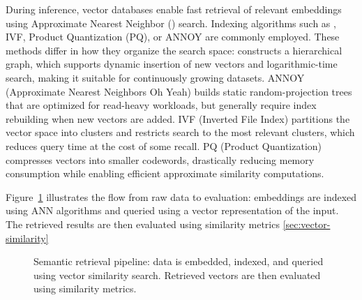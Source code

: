 During inference, vector databases enable fast retrieval of relevant embeddings using Approximate Nearest Neighbor () search. 
Indexing algorithms such as , IVF, Product Quantization (PQ), or ANNOY are commonly employed. 
These methods differ in how they organize the search space: 
 constructs a hierarchical graph, which supports dynamic insertion of new vectors and logarithmic-time search, making it suitable for continuously growing datasets. 
ANNOY (Approximate Nearest Neighbors Oh Yeah) builds static random-projection trees that are optimized for read-heavy workloads, but generally require index rebuilding when new vectors are added. 
IVF (Inverted File Index) partitions the vector space into clusters and restricts search to the most relevant clusters, which reduces query time at the cost of some recall. 
PQ (Product Quantization) compresses vectors into smaller codewords, drastically reducing memory consumption while enabling efficient approximate similarity computations. 

Figure~\ref{fig:semantic-search-pipeline} illustrates the flow from raw data to evaluation: embeddings are indexed using ANN algorithms and queried using a vector representation of the input. The retrieved results are then evaluated using similarity metrics \ref{sec:vector-similarity}
\begin{figure}[H]
    \centering
    \caption{Semantic retrieval pipeline: data is embedded, indexed, and queried using vector similarity search. Retrieved vectors are then evaluated using similarity metrics.}
    \label{fig:semantic-search-pipeline}
\end{figure}

